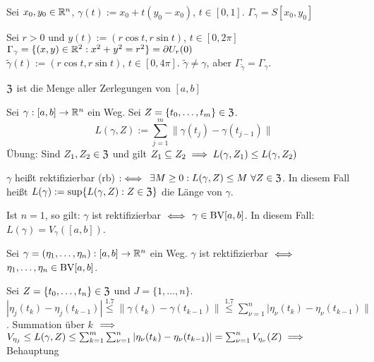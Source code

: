 \documentclass[a4paper,twoside,DIV15,BCOR12mm]{scrbook}
\begin{document}
\begin{beispiele}
\item Sei $x_0, y_0\in\mathbb{R}^n$, $\gamma(t) := x_0 + t(y_0-x_0)$, $t\in[0,1]$. $\Gamma_\gamma=S[x_0,y_0]$
\item Sei $r>0$ und $y(t) := (r \cos t, r \sin t)$, $t\in[0,2\pi]$\\ $\Gamma_\gamma=\{(x,y)\in\mathbb{R}^2: x^2+y^2=r^2\} = \partial U_r(0)$ \\
$\tilde\gamma(t) := (r \cos t, r \sin t)$, $t\in[0,4\pi]$. $\tilde\gamma \ne \gamma$, aber $\Gamma_{\tilde\gamma} = \Gamma_\gamma$.
\end{beispiele}

\begin{erinnerung}
$\mathfrak{Z}$ ist die Menge aller Zerlegungen von $[a,b]$
\end{erinnerung}

\begin{definition}
Sei $\gamma:[a,b]\to \mathbb{R}^n$ ein Weg. Sei $Z=\{t_0, \ldots, t_m\} \in \mathfrak{Z}$.\\
$$L(\gamma,Z):= \sum_{j=1}^m\|\gamma(t_j) - \gamma(t_{j-1})\|$$
Übung: Sind $Z_1,Z_2\in\mathfrak{Z}$ und gilt $Z_1 \subseteq Z_2 \implies L(\gamma,Z_1) \le L(\gamma,Z_2)$

$\gamma$ heißt rektifizierbar (rb)  $:\iff$ $\exists M\ge0: L(\gamma,Z)\le M\ \forall Z\in\mathfrak{Z}$. In diesem Fall heißt $L(\gamma) := \sup\{L(\gamma,Z): Z\in\mathfrak{Z}\}$ die Länge von $\gamma$.

Ist $n=1$, so gilt: $\gamma$ ist rektifizierbar $\iff$ $\gamma\in \text{BV}[a,b]$. In diesem Fall: $L(\gamma) = V_\gamma([a,b])$.
\end{definition}

\begin{satz}
Sei $\gamma = (\eta_1, \ldots, \eta_n):[a,b]\to\mathbb{R}^n$ ein Weg. $\gamma$ ist rektifizierbar $\iff$ \mbox{$\eta_1,\ldots,\eta_n\in \text{BV}[a,b]$}.
\end{satz}

\begin{beweis}
Sei $Z = \{t_0,\ldots,t_n\} \in \mathfrak{Z}$ und $J=\{1,\ldots,n\}$.\\
$|\eta_j(t_k)-\eta_j(t_{k-1})| \stackrel{\text{1.7}}{\le} \|\gamma(t_k) - \gamma(t_{k-1})\| \stackrel{\text{1.7}}\le \sum_{\nu=1}^n |\eta_\nu(t_k) - \eta_\nu(t_{k-1})\|$. Summation über $k$ $\implies$ $V_{\eta_j} \le L(\gamma,Z) \le \sum_{k=1}^m\sum_{\nu=1}^n |\eta_\nu(t_k)-\eta_\nu(t_{k-1})| = \sum_{\nu=1}^n V_{\eta_\nu}(Z) \implies$ Behauptung
\end{beweis}
\end{document}

